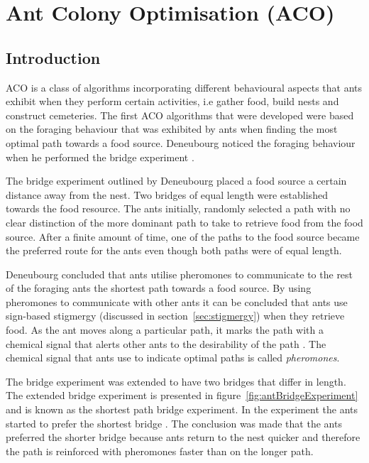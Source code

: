 \section{Ant Colony Optimisation (ACO)}
\label{sec:ACO}
\subsection{Introduction}
\label{sec:ACOverview}
ACO is a class of algorithms incorporating different behavioural aspects that ants exhibit when they perform certain activities, i.e gather food, build nests and construct cemeteries\cite{AntsAndStigmergy,CompuIntelligenceIntro}. The first \gls{ACO} algorithms that were developed were based on the foraging behaviour that was exhibited by ants when finding the most optimal path towards a food source. Deneubourg noticed the foraging behaviour when he performed the bridge experiment \cite{AntsAndStigmergy,CompuIntelligenceIntro}.

The bridge experiment outlined by Deneubourg placed a food source a certain distance away from the nest\cite{AntsAndStigmergy,CompuIntelligenceIntro}. Two bridges of equal length were established towards the food resource. The ants initially, randomly selected a path with no clear distinction of the more dominant path to take to retrieve food from the food source\cite{AntsAndStigmergy,CompuIntelligenceIntro}. After a finite amount of time, one of the paths to the food source became the preferred route for the ants even though both paths were of equal length.

Deneubourg concluded that ants utilise pheromones to communicate to the rest of the foraging ants the shortest path towards a food source.\cite{FundamentalSwarm} By using pheromones to communicate with other ants it can be concluded that ants use sign-based stigmergy (discussed in section~\ref{sec:stigmergy}) when they retrieve food\cite{AntIntroTrends,AntsAndStigmergy,CompuIntelligenceIntro}. As the ant moves along a particular path, it marks the path with a chemical signal that alerts other ants to the desirability of the path \cite{CompuIntelligenceIntro}. The chemical signal that ants use to indicate optimal paths is called \emph{pheromones}\cite{AntsAndStigmergy,CompuIntelligenceIntro}.

The bridge experiment was extended to have two bridges that differ in length. The extended bridge experiment is presented in figure~\ref{fig:antBridgeExperiment} and is known as the shortest path bridge experiment\cite{FundamentalSwarm}. In the experiment the ants started to prefer the shortest bridge \cite{FundamentalSwarm}. The conclusion was made that the ants preferred the shorter bridge because ants return to the nest quicker and therefore the path is reinforced with pheromones faster than on the longer path\cite{FundamentalSwarm}.

